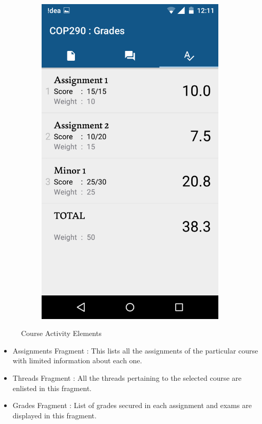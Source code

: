 \documentclass{article}
\begin{document}
\begin{itemize}
\begin{figure}[!h]
\begin{subfigure}{.4\textwidth}
	\includegraphics[width=0.8\linewidth]{pic8}
\end{subfigure}
\caption*{Course Activity Elements}
\end{figure}
	\begin{itemize}
	\item Assignments Fragment : This lists all the assignments of the particular course with limited information about each one.\\
	\item Threads Fragment : All the threads pertaining to the selected course are enlisted in this fragment.\\
	\item Grades Fragment : List of grades secured in each assignment and exams are displayed in this fragment.\\
	\end{itemize}

\end{itemize}
\end{document}
